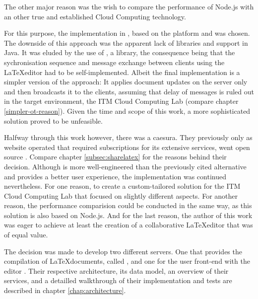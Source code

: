 The other major reason was the wish to compare the performance of Node.js with an other true and established Cloud Computing technology.

\pagebreak

For this purpose, the implementation in , based on the  platform and  was chosen. The downside of this approach was the apparent lack of  libraries and support in Java. It was eluded by the use of , a  library, the consequence being that the sychronisation sequence and message exchange between clients using the \LaTeX editor had to be self-implemented. Albeit the final implementation is a simpler version of the  approach: It applies document updates on the server only and then broadcasts it to the clients, assuming that delay of messages is ruled out in the target environment, the ITM Cloud Computing Lab (compare chapter \ref{simpler-ot-reason}). Given the time and scope of this work, a more sophisticated solution proved to be unfeasible.

Halfway through this work however, there was a caesura. They previously only as website operated  that required subscriptions for its extensive services, went open source  \cite{website:sharelatex-oss}. Compare chapter \ref{subsec:sharelatex} for the reasons behind their decision. Although  is more well-engineered than the previously cited alternative and provides a better user experience, the implementation was continued nevertheless. For one reason, to create a custom-tailored solution for the ITM Cloud Computing Lab that focused on slightly different aspects. For another reason, the performance comparision could be conducted in the same way, as this solution is also based on Node.js. And for the last reason, the author of this work was eager to achieve at least the creation of a collaborative \LaTeX editor that was of equal value.

The decision was made to develop two different servers. One that provides the compilation of \LaTeX documents, called , and one for the user front-end with the editor . Their respective architecture, its data model, an overview of their services, and a detailled walkthrough of their implementation and tests are described in chapter \ref{chap:architecture}.

